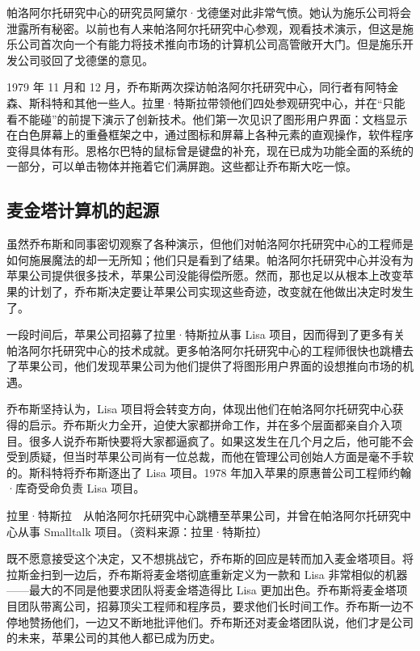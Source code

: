 \documentclass[12pt,UTF8]{ctexbook}
\begin{document}
帕洛阿尔托研究中心的研究员阿黛尔·戈德堡对此非常气愤。她认为施乐公司将会泄露所有秘密。以前也有人来帕洛阿尔托研究中心参观，观看技术演示，但这是施乐公司首次向一个有能力将技术推向市场的计算机公司高管敞开大门。但是施乐开发公司驳回了戈德堡的意见。

1979 年 11 月和 12 月，乔布斯两次探访帕洛阿尔托研究中心，同行者有阿特金森、斯科特和其他一些人。拉里·特斯拉带领他们四处参观研究中心，并在“只能看不能碰”的前提下演示了创新技术。他们第一次见识了图形用户界面：文档显示在白色屏幕上的重叠框架之中，通过图标和屏幕上各种元素的直观操作，软件程序变得具体有形。恩格尔巴特的鼠标曾是键盘的补充，现在已成为功能全面的系统的一部分，可以单击物体并拖着它们满屏跑。这些都让乔布斯大吃一惊。





\subsection{麦金塔计算机的起源}


虽然乔布斯和同事密切观察了各种演示，但他们对帕洛阿尔托研究中心的工程师是如何施展魔法的却一无所知；他们只是看到了结果。帕洛阿尔托研究中心并没有为苹果公司提供很多技术，苹果公司没能得偿所愿。然而，那也足以从根本上改变苹果的计划了，乔布斯决定要让苹果公司实现这些奇迹，改变就在他做出决定时发生了。

一段时间后，苹果公司招募了拉里·特斯拉从事 Lisa 项目，因而得到了更多有关帕洛阿尔托研究中心的技术成就。更多帕洛阿尔托研究中心的工程师很快也跳槽去了苹果公司，他们发现苹果公司为他们提供了将图形用户界面的设想推向市场的机遇。

乔布斯坚持认为，Lisa 项目将会转变方向，体现出他们在帕洛阿尔托研究中心获得的启示。乔布斯火力全开，迫使大家都拼命工作，并在多个层面都亲自介入项目。很多人说乔布斯快要将大家都逼疯了。如果这发生在几个月之后，他可能不会受到质疑，但当时苹果公司尚有一位总裁，而他在管理公司创始人方面是毫不手软的。斯科特将乔布斯逐出了 Lisa 项目。1978 年加入苹果的原惠普公司工程师约翰·库奇受命负责 Lisa 项目。



拉里·特斯拉　从帕洛阿尔托研究中心跳槽至苹果公司，并曾在帕洛阿尔托研究中心从事 Smalltalk 项目。（资料来源：拉里·特斯拉）

既不愿意接受这个决定，又不想挑战它，乔布斯的回应是转而加入麦金塔项目。将拉斯金扫到一边后，乔布斯将麦金塔彻底重新定义为一款和 Lisa 非常相似的机器——最大的不同是他要求团队将麦金塔造得比 Lisa 更加出色。乔布斯将麦金塔项目团队带离公司，招募顶尖工程师和程序员，要求他们长时间工作。乔布斯一边不停地赞扬他们，一边又不断地批评他们。乔布斯还对麦金塔团队说，他们才是公司的未来，苹果公司的其他人都已成为历史。
\end{document}
